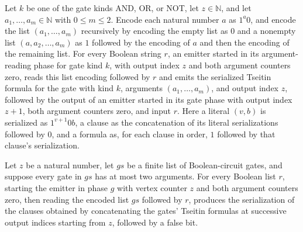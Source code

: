 \begin{theorem}
\label{BoolCircuit.CktSatReduction.Emitter.emRun_args}
\leanok
{}
Let $k$ be one of the gate kinds AND, OR, or NOT, let $z\in\mathbb N$, and let
$a_1,\ldots,a_m\in\mathbb N$ with $0\le m\le 2$. Encode each natural number $a$ as
$1^a0$, and encode the list $(a_1,\ldots,a_m)$ recursively by encoding the empty list as
$0$ and a nonempty list $(a,a_2,\ldots,a_m)$ as $1$ followed by the encoding of $a$ and
then the encoding of the remaining list. For every Boolean string $r$, an emitter
started in its argument-reading phase for gate kind $k$, with output index $z$ and both
argument counters zero, reads this list encoding followed by $r$ and emits the
serialized Tseitin formula for the gate with kind $k$, arguments $(a_1,\ldots,a_m)$, and
output index $z$, followed by the output of an emitter started in its gate phase with
output index $z+1$, both argument counters zero, and input $r$. Here a literal $(v,b)$
is serialized as $1^{v+1}0b$, a clause as the concatenation of its literal
serializations followed by $0$, and a formula as, for each clause in order, $1$ followed
by that clause’s serialization.
\end{theorem}

\begin{theorem}
\label{BoolCircuit.CktSatReduction.Emitter.emRun_gates}
\leanok
{}
Let $z$ be a natural number, let $gs$ be a finite list of Boolean-circuit gates, and
suppose every gate in $gs$ has at most two arguments. For every Boolean list $r$,
starting the emitter in phase $g$ with vertex counter $z$ and both argument counters
zero, then reading the encoded list $gs$ followed by $r$, produces the serialization of
the clauses obtained by concatenating the gates’ Tseitin formulas at successive output
indices starting from $z$, followed by a false bit.
\end{theorem}

